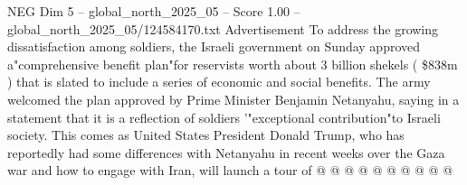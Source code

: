 \begin{textsample}{NEG Dim 5 – global\_north\_2025\_05 – Score 1.00 – global\_north\_2025\_05/124584170.txt}
Advertisement To address the growing dissatisfaction among soldiers, the Israeli government on Sunday approved a"comprehensive benefit plan"for reservists worth about 3 billion shekels ( \$838m ) that is slated to include a series of economic and social benefits.
The army welcomed the plan approved by Prime Minister Benjamin Netanyahu, saying in a statement that it is a reflection of soldiers '"exceptional contribution"to Israeli society.
This comes as United States President Donald Trump, who has reportedly had some differences with Netanyahu in recent weeks over the Gaza war and how to engage with Iran, will launch a tour of @ @ @ @ @ @ @ @ @ @

\end{textsample}

